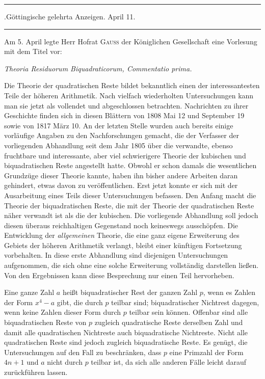 \clearpage
{}%
\begin{center}
\rule{.82\linewidth}{.35pt}\par
.Göttingische gelehrta Anzeigen. April 11.\par
\rule{.82\linewidth}{.35pt}
\end{center}
Am 5. April legte Herr Hofrat \textsc{Gauss} der Königlichen Gesellschaft eine Vorlesung mit dem Titel vor:
\begin{center}\itshape
Theoria Residuorum Biquadraticorum, Commentatio prima.
\end{center}

Die Theorie der quadratischen Reste bildet bekanntlich einen der interessantesten Teile der höheren Arithmetik. Nach vielfach wiederholten Untersuchungen kann man sie jetzt als vollendet und abgeschlossen betrachten. Nachrichten zu ihrer Geschichte finden sich in diesen Blättern von 1808 Mai 12 und September 19 sowie von 1817 März 10. An der letzten Stelle wurden auch bereits einige vorläufige Angaben zu den Nachforschungen gemacht, die der Verfasser der vorliegenden Abhandlung seit dem Jahr 1805 über die verwandte, ebenso fruchtbare und interessante, aber viel schwierigere Theorie der kubischen und biquadratischen Reste angestellt hatte. Obwohl er schon damals die wesentlichen Grundzüge dieser Theorie kannte, haben ihn bisher andere Arbeiten daran gehindert, etwas davon zu veröffentlichen. Erst jetzt konnte er sich mit der Ausarbeitung eines Teils dieser Untersuchungen befassen. Den Anfang macht die Theorie der biquadratischen Reste, die mit der Theorie der quadratischen Reste näher verwandt ist als die der kubischen. Die vorliegende Abhandlung soll jedoch
%
diesen überaus reichhaltigen Gegenstand noch keineswegs ausschöpfen. Die Entwicklung der \emph{allgemeinen} Theorie, die eine ganz eigene Erweiterung des Gebiets der höheren Arithmetik verlangt, bleibt einer künftigen Fortsetzung vorbehalten. In diese erste Abhandlung sind diejenigen Untersuchungen aufgenommen, die sich ohne eine solche Erweiterung vollständig darstellen ließen. Von den Ergebnissen kann diese Besprechung nur einen Teil hervorheben.

Eine ganze Zahl $a$ heißt biquadratischer Rest der ganzen Zahl $p$, wenn es Zahlen der Form $x^4-a$ gibt, die durch $p$ teilbar sind; biquadratischer Nichtrest dagegen, wenn keine Zahlen dieser Form durch $p$ teilbar sein können. Offenbar sind alle biquadratischen Reste von $p$ zugleich quadratische Reste derselben Zahl und damit alle quadratischen Nichtreste auch biquadratische Nichtreste. Nicht alle quadratischen Reste sind jedoch zugleich biquadratische Reste. Es genügt, die Untersuchungen auf den Fall zu beschränken, dass $p$ eine Primzahl der Form $4n+1$ und $a$ nicht durch $p$ teilbar ist, da sich alle anderen Fälle leicht darauf zurückführen lassen.


